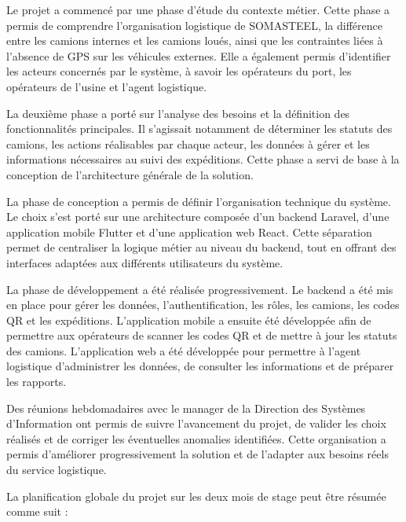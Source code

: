 Le projet a commencé par une phase d'étude du contexte métier. Cette phase a permis de comprendre l'organisation logistique de SOMASTEEL, la différence entre les camions internes et les camions loués, ainsi que les contraintes liées à l'absence de GPS sur les véhicules externes. Elle a également permis d'identifier les acteurs concernés par le système, à savoir les opérateurs du port, les opérateurs de l'usine et l'agent logistique.

La deuxième phase a porté sur l'analyse des besoins et la définition des fonctionnalités principales. Il s'agissait notamment de déterminer les statuts des camions, les actions réalisables par chaque acteur, les données à gérer et les informations nécessaires au suivi des expéditions. Cette phase a servi de base à la conception de l'architecture générale de la solution.

La phase de conception a permis de définir l'organisation technique du système. Le choix s'est porté sur une architecture composée d'un backend Laravel, d'une application mobile Flutter et d'une application web React. Cette séparation permet de centraliser la logique métier au niveau du backend, tout en offrant des interfaces adaptées aux différents utilisateurs du système.

La phase de développement a été réalisée progressivement. Le backend a été mis en place pour gérer les données, l'authentification, les rôles, les camions, les codes QR et les expéditions. L'application mobile a ensuite été développée afin de permettre aux opérateurs de scanner les codes QR et de mettre à jour les statuts des camions. L'application web a été développée pour permettre à l'agent logistique d'administrer les données, de consulter les informations et de préparer les rapports.

Des réunions hebdomadaires avec le manager de la Direction des Systèmes d'Information ont permis de suivre l'avancement du projet, de valider les choix réalisés et de corriger les éventuelles anomalies identifiées. Cette organisation a permis d'améliorer progressivement la solution et de l'adapter aux besoins réels du service logistique.

La planification globale du projet sur les deux mois de stage peut être résumée comme suit :

